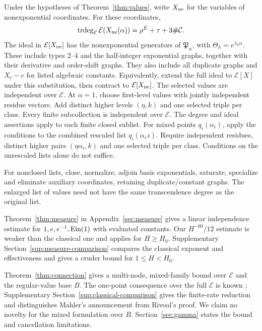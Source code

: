 \begin{corollary}\label{cor:value-base}
Under the hypotheses of Theorem~\ref{thm:values}, write $X_{\rm ne}$ for the variables of nonexponential coordinates.
For these coordinates,
\begin{equation}\label{eq:value-exponential-base}
\operatorname{trdeg}_{\mathcal E}\mathcal E(X_{\rm ne}(\alpha))
=\rho^E+\tau+3\#\mathcal C.
\end{equation}
The ideal in $\mathcal E[X_{\rm ne}]$ has the nonexponential generators
of $\mathfrak P_\alpha$, with $\Theta_h=e^{\lambda_h\alpha}$.
These include types 2--4 and the half-integer exponential graphs,
together with their derivative and order-shift graphs.
They also include all duplicate graphs and $X_c-c$ for listed algebraic constants.
Equivalently, extend the full ideal to $\mathcal E[X]$ under this
substitution, then contract to $\mathcal E[X_{\rm ne}]$.
The selected values are independent over $\mathcal E$.
At $\alpha=1$, choose first-level values with jointly independent residue vectors.
Add distinct higher levels $(\eta,k)$ and one selected triple per class.
Every finite subcollection is independent over $\mathcal E$.
The degree and ideal assertions apply to each finite closed sublist.
For mixed points $q_i(\alpha_i)$, apply the conditions to the combined
rescaled list $q_i(\alpha_i z)$.
Require independent residues, distinct higher pairs $(\eta\alpha_i,k)$
and one selected triple per class.
Conditions on the unrescaled lists alone do not suffice.
\end{corollary}

For nonclosed lists, close, normalize, adjoin basis exponentials, saturate,
specialize and eliminate auxiliary coordinates, retaining duplicate/constant graphs.
The enlarged list of values need not have the same transcendence degree as the original list.

Theorem~\ref{thm:measure} in Appendix~\ref{sec:measure} gives a linear independence estimate
for $1,e,\allowbreak e^{-1},\operatorname{Ein}(1)$ with evaluated constants.
\setcounter{theorem}{4}
Our $H^{-60}/12$ estimate is weaker than the classical one
and applies for $H\ge H_0$.
Supplementary Section~\ref{sup:measure-comparison} compares the classical exponent and
effectiveness and gives a cruder bound for $1\le H<H_0$.

Theorem~\ref{thm:connection} gives a multi-node, mixed-family bound over
$\mathcal E$ and the regular-value base $B$.
The one-point consequence over the full $\mathcal E$ is known
\cite[Ch.~7, \S1, Theorem~1, pp.~232--233]{Shidlovskii1989};
Supplementary Section~\ref{sup:classical-comparison} gives the finite-rate reduction and distinguishes
Mahler's announcement from Rivoal's proof.
We claim no novelty for the mixed formulation over $B$.
Section~\ref{sec:gamma} states the bound and cancellation limitations.


